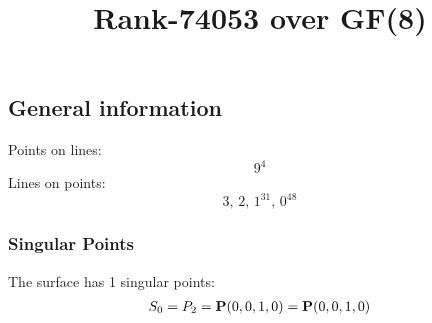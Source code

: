 \documentclass{article}
\newcommand\setTBstruts{\def\T{\rule{0pt}{2.6ex}}%
\def\B{\rule[-1.2ex]{0pt}{0pt}}}
\newcommand{\bP}{{\bf P}}
\begin{document}
 
\setTBstruts



{\allowdisplaybreaks%






\title{Rank-74053 over GF(8)}
\author{}%
\maketitle%
%
{}



\subsection*{General information}
Points on lines:
$$
9^4$$
Lines on points:
$$
3,\,2,\,1^{31},\,0^{48}$$
\subsubsection*{Singular Points}
The surface has 1 singular points:\\
\begin{align*}
S_{0} &= P_{2}=\bP(0, 0, 1, 0) = \bP(0, 0, 1, 0)\\
\end{align*}
}
\end{document}
